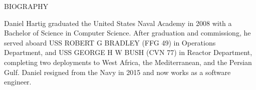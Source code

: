 \documentclass[11pt]{report}
\begin{document}
\begin{appendices}
\end{appendices}

 

\pagebreak

\newpage
\begin{center}
BIOGRAPHY\\ [0.5 in]
\end{center}
Daniel Hartig graduated the United States Naval Academy in 2008 with a Bachelor of Science in Computer Science. After graduation and commissiong, he served aboard USS ROBERT G BRADLEY (FFG 49) in Operations Department, and USS GEORGE H W BUSH (CVN 77) in Reactor Department, completing two deployments to West Africa, the Mediterranean, and the Persian Gulf. Daniel resigned from the Navy in 2015 and now works as a software engineer. 
\end{document}
